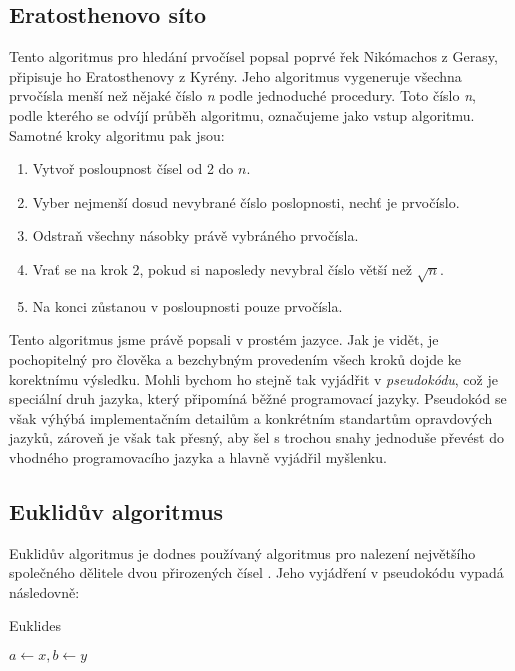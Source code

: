 \documentclass[12pt]{report}			%
\begin{document}
				
				\subsection{Eratosthenovo síto}
				Tento algoritmus pro hledání prvočísel popsal poprvé řek Nikómachos z Gerasy, připisuje ho Eratosthenovy z Kyrény. Jeho algoritmus vygeneruje všechna prvočísla menší než nějaké číslo \emph{n} podle jednoduché procedury. \cite{history} Toto číslo \emph{n}, podle kterého se odvíjí průběh algoritmu, označujeme jako vstup algoritmu. \\ Samotné kroky algoritmu pak jsou:
				\begin{enumerate}
				\item Vytvoř posloupnost čísel od 2 do $n$.
				\item Vyber nejmenší dosud nevybrané číslo poslopnosti, nechť je prvočíslo.
				\item Odstraň všechny násobky právě vybráného prvočísla.
				\item Vrať se na krok 2, pokud si naposledy nevybral číslo větší než $\sqrt{n}$.							
				\item Na konci zůstanou v posloupnosti pouze prvočísla.
				
				\end{enumerate}
				Tento algoritmus jsme právě popsali v prostém jazyce. Jak je vidět, je pochopitelný pro člověka a bezchybným provedením všech kroků dojde ke korektnímu výsledku. Mohli bychom ho stejně tak vyjádřit v \emph{pseudokódu}, což je speciální druh jazyka, který připomíná běžné programovací jazyky. Pseudokód se však výhýbá implementačním detailům a konkrétním standartům opravdových jazyků, zároveň je však tak přesný, aby šel s trochou snahy jednoduše převést do vhodného programovacího jazyka a hlavně vyjádřil myšlenku. \cite{pruvodce}
				\subsection{Euklidův algoritmus}
				Euklidův algoritmus je dodnes používaný algoritmus pro nalezení největšího společného dělitele dvou přirozených čísel \cite{pruvodce}. 
				Jeho vyjádření v pseudokódu vypadá následovně:
				
				\begin{algorithm}
			    \caption{Euklides \cite{pruvodce}}
				$a\gets x, b\gets y$\;  				
				\end{algorithm}
				
\end{document}
